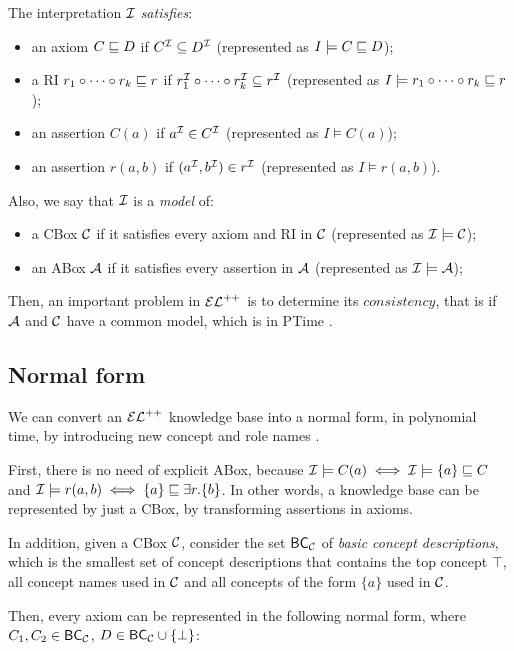 The interpretation $\mathcal{I}$ \emph{satisfies}:
\begin{itemize}
  \item an axiom $C \sqsubseteq D$ if $C^{\mathcal{I}} \subseteq D^{\mathcal{I}}$ (represented as $I \models C \sqsubseteq D$);
  
  \item a RI $r_1 \circ \cdots \circ r_k \sqsubseteq r$ if $r_1^{\mathcal{I}} \circ \cdots \circ r_k^{\mathcal{I}} \subseteq r^{\mathcal{I}}$ (represented as $I \models r_1 \circ \cdots \circ r_k \sqsubseteq r$);
  
  \item an assertion $C(a)$ if $a^{\mathcal{I}} \in C^{\mathcal{I}}$ (represented as $I \models C(a)$);
  
  \item an assertion $r(a, b)$ if $(a^{\mathcal{I}}, b^{\mathcal{I}}) \in r^{\mathcal{I}}$ (represented as $I \models r(a, b)$). 
\end{itemize}

Also, we say that $\mathcal{I}$ is a \emph{model} of:
\begin{itemize}
  \item a CBox $\mathcal{C}$ if it satisfies every axiom and RI in $\mathcal{C}$ (represented as $\mathcal{I} \models \mathcal{C}$);
  \item an ABox $\mathcal{A}$ if it satisfies every assertion in $\mathcal{A}$ (represented as $\mathcal{I} \models \mathcal{A}$);
\end{itemize}

Then, an important problem in $\mathcal{EL}^{++}$ is to determine its $consistency$, that is if $\mathcal{A}$ and $\mathcal{C}$ have a common model, which is in PTime \citep{Baader2005a}.

\subsection{Normal form}
We can convert an $\mathcal{EL}^{++}$ knowledge base into a normal form, in polynomial time, by introducing new concept and role names \citep{Baader2005a}.

First, there is no need of explicit ABox, because $\mathcal{I} \models C(a)\iff \mathcal{I} \models \{a\} \sqsubseteq C$ and $\mathcal{I} \models r(a, b) \iff \{a\} \sqsubseteq \exists r.\{b\}$. In other words, a knowledge base can be represented by just a CBox, by transforming assertions in axioms.  

In addition, given a CBox $\mathcal{C}$, consider the set $\mathsf{BC}_\mathcal{C}$ of \emph{basic concept descriptions}, which is the smallest set of concept descriptions that contains the top concept $\top$, all concept names used in $\mathcal{C}$ and all concepts of the form $\{a\}$ used in $\mathcal{C}$.

Then, every axiom can be represented in the following normal form, where $C_1, C_2 \in \mathsf{BC}_\mathcal{C}$, $D \in \mathsf{BC}_\mathcal{C} \cup \{\bot\}$:

